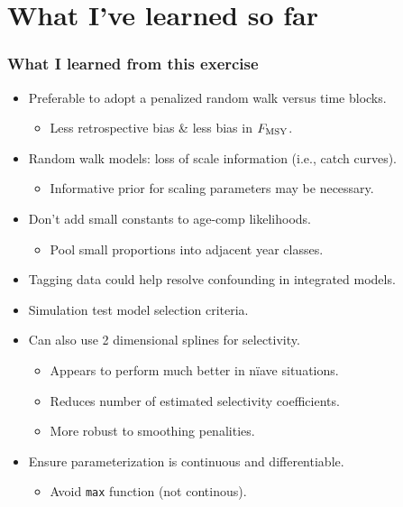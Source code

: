 \documentclass[table]{beamer}
\begin{document}



\section{What I've learned so far} %
\label{sec:discussion}

\begin{frame}[t]\frametitle{What I learned from this exercise}
    
	\begin{itemize}
		\item<+-> Preferable to adopt a penalized random walk versus time blocks.
			\begin{itemize}
				\item Less retrospective bias \& less bias in $F_{\rm{MSY}}$.
			\end{itemize}
		\item<+-> Random walk models: loss of scale information (i.e., catch curves).
			\begin{itemize}
				\item Informative prior for scaling parameters may be necessary.
			\end{itemize}
		\item<+-> \alert<3>{Don't add small constants to age-comp likelihoods.}
			\begin{itemize}
				\item  Pool small proportions into adjacent year classes.
			\end{itemize}
		\item<+-> Tagging data could help resolve confounding in integrated models.
		\item<+-> Simulation test model selection criteria.
		\item<+-> Can also use 2 dimensional splines for selectivity.
		\begin{itemize}
			\item Appears to perform much better in n\"iave situations.
			\item Reduces number of estimated selectivity coefficients.
			\item More robust to smoothing penalities.
		\end{itemize}
		\item<+-> Ensure parameterization is continuous and differentiable.
			\begin{itemize}
				\item Avoid \texttt{max} function (not continous).
			\end{itemize}
	\end{itemize}

\end{frame}
\end{document}
